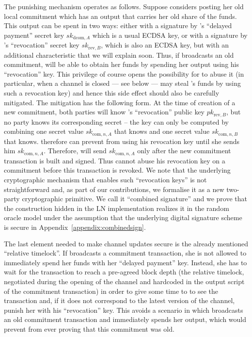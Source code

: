     The punishing mechanism operates as follows. Suppose \alice{} considers
    posting her old local commitment which has an output that carries her old
    share of the funds. This output can be spent in two ways: either with a
    signature by \alice's ``delayed payment'' secret key
    $sk_{\mathrm{dcom}, A}$ which is a usual ECDSA key, or with a
    signature by \bob's ``revocation'' secret key $sk_{\mathrm{rev},
    B}$, which is also an ECDSA key, but with an additional characteristic that
    we will explain soon. Thus, if \alice{} broadcasts an old commitment, \bob{}
    will be able to obtain her funds by spending her output using his
    ``revocation'' key. This privilege of course opens the possibility for
    \bob{} to abuse it (in particular, when a channel is closed --- see below
    --- \bob{} may steal \alice's funds by using such a revocation key) and
    hence this side effect should also be carefully mitigated. The mitigation
    has the following form. At the time of creation of a new commitment, both
    parties will know \bob's ``revocation'' public key $pk_{\mathrm{rev}, B}$,
    but no party knows its corresponding secret -- the key can only be computed
    by combining one secret value $sk_{\mathrm{com}, n, A}$ that
    \alice{} knows and one secret value $sk_{\mathrm{com}, n, B}$ that
    \bob{} knows. \alice{} therefore can prevent \bob{} from using his
    revocation key until she sends him $sk_{\mathrm{com}, n, A}$.
    Therefore, \alice{} will send \bob{} $sk_{\mathrm{com}, n, A}$ only
    after the new commitment transaction is built and signed. Thus \bob{} cannot
    abuse his revocation key on a commitment before this transaction is revoked.
    We note that the underlying cryptographic mechanism  that enables such
    ``revocation keys'' is not straightforward and, as part of our
    contributions, we formalise it as a new two-party cryptographic primitive.
    We call it ``combined signature'' and we prove that the construction hidden
    in the LN implementation realizes it in the random oracle model under the
    assumption that the underlying digital signature scheme is secure in
    Appendix~\ref{appendix:combinedsign}.

    The last element needed to make channel updates secure is the
    already mentioned ``relative timelock''. If \alice{} broadcasts a
    commitment transaction, she is not allowed to immediately spend her funds
    with her ``delayed payment'' key. Instead, she has to wait for the
    transaction to reach a pre-agreed block depth (the relative timelock,
    negotiated during the opening of the channel and hardcoded in the
    output script of the commitment transaction) in order to give some time to
    \bob{} to see the transaction and, if it does not correspond to the latest
    version of the channel, punish her with his ``revocation'' key. This avoids
    a scenario in which \alice{} broadcasts an old commitment transaction and
    immediately spends her output, which would prevent \bob{} from ever proving
    that this commitment was old.

